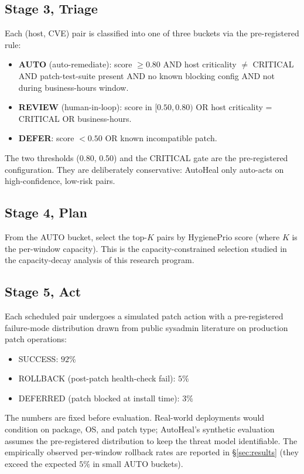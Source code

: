\subsection{Stage 3, Triage}

Each (host, CVE) pair is classified into one of three buckets via
the pre-registered rule:

\begin{itemize}
\item \textbf{AUTO} (auto-remediate): score $\geq 0.80$ AND
host criticality $\neq$ CRITICAL AND patch-test-suite present AND
no known blocking config AND not during business-hours window.
\item \textbf{REVIEW} (human-in-loop): score in $[0.50, 0.80)$ OR
host criticality = CRITICAL OR business-hours.
\item \textbf{DEFER}: score $< 0.50$ OR known incompatible patch.
\end{itemize}

The two thresholds (0.80, 0.50) and the CRITICAL gate are the
pre-registered configuration. They are deliberately conservative:
AutoHeal only auto-acts on high-confidence, low-risk pairs.

\subsection{Stage 4, Plan}

From the AUTO bucket, select the top-$K$ pairs by HygienePrio
score (where $K$ is the per-window capacity). This is the
capacity-constrained selection studied in the capacity-decay
analysis of this research program.

\subsection{Stage 5, Act}

Each scheduled pair undergoes a simulated patch action with a
pre-registered failure-mode distribution drawn from public
sysadmin literature on production patch operations:
\begin{itemize}
\item SUCCESS: $92\%$
\item ROLLBACK (post-patch health-check fail): $5\%$
\item DEFERRED (patch blocked at install time): $3\%$
\end{itemize}

The numbers are fixed before evaluation. Real-world deployments
would condition on package, OS, and patch type; AutoHeal's
synthetic evaluation assumes the pre-registered distribution to
keep the threat model identifiable. The empirically observed
per-window rollback rates are reported in \S\ref{sec:results}
(they exceed the expected $5\%$ in small AUTO buckets).

